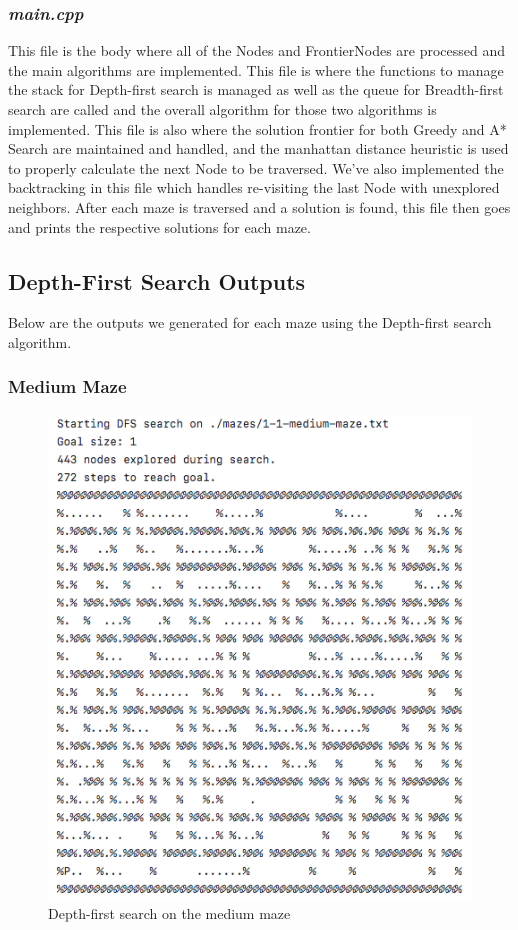 \documentclass[titlepage]{article}
\begin{document}
\subsubsection{\textit{main.cpp}}
This file is the body where all of the Nodes and FrontierNodes are processed and the main algorithms are implemented. This file is where the functions to manage the stack for Depth-first search is managed as well as the queue for Breadth-first search are called and the overall algorithm for those two algorithms is implemented. This file is also where the solution frontier for both Greedy and A* Search are maintained and handled, and the manhattan distance heuristic is used to properly calculate the next Node to be traversed. We've also implemented the backtracking in this file which handles re-visiting the last Node with unexplored neighbors. After each maze is traversed and a solution is found, this file then goes and prints the respective solutions for each maze.

\newpage

\subsection{Depth-First Search Outputs}
Below are the outputs we generated for each maze using the Depth-first search algorithm. 
\subsubsection{Medium Maze}
\begin{figure}[h!]
\includegraphics[width=\linewidth]{dfsmedium.png}
\caption{Depth-first search on the medium maze}
\label{fig:DFSmedium}
\end{figure}
\end{document}
